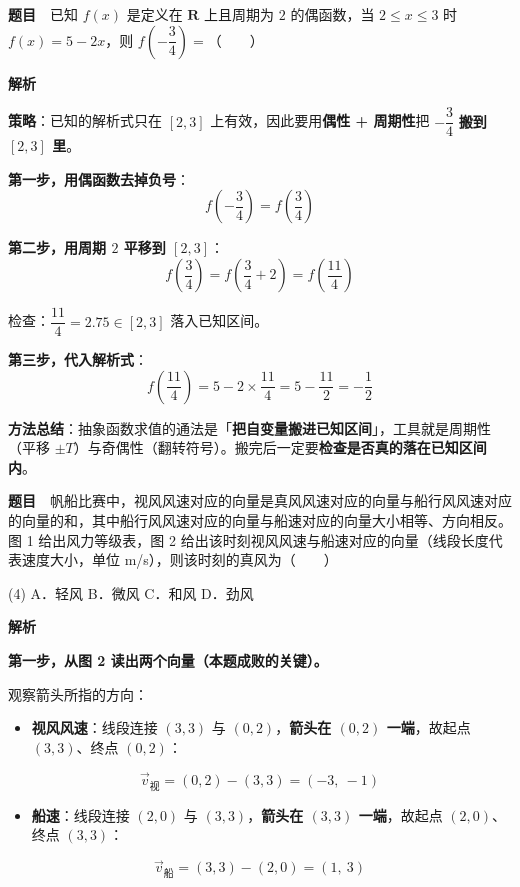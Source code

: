 \par\medskip


\textbf{题目}　已知 $f(x)$ 是定义在 $\mathbf R$ 上且周期为 $2$ 的偶函数，当 $2\le x\le3$ 时 $f(x)=5-2x$，则 $f\left(-\dfrac34\right)=$（　　）

\textbf{解析}

\textbf{策略}：已知的解析式只在 $[2,3]$ 上有效，因此要用\textbf{偶性 + 周期性}把 $-\dfrac34$ \textbf{搬到 $[2,3]$ 里}。

\textbf{第一步，用偶函数去掉负号}：
\[f\left(-\frac34\right)=f\left(\frac34\right)\]

\textbf{第二步，用周期 $2$ 平移到 $[2,3]$}：
\[f\left(\frac34\right)=f\left(\frac34+2\right)=f\left(\frac{11}{4}\right)\]

检查：$\dfrac{11}{4}=2.75\in[2,3]$  落入已知区间。

\textbf{第三步，代入解析式}：
\[f\left(\frac{11}{4}\right)=5-2\times\frac{11}{4}=5-\frac{11}{2}=-\frac12\]


\begin{gktip}
\textbf{方法总结}：抽象函数求值的通法是「\textbf{把自变量搬进已知区间}」，工具就是周期性（平移 $\pm T$）与奇偶性（翻转符号）。搬完后一定要\textbf{检查是否真的落在已知区间内}。
\end{gktip}

\par\medskip


\textbf{题目}　帆船比赛中，视风风速对应的向量是真风风速对应的向量与船行风风速对应的向量的和，其中船行风风速对应的向量与船速对应的向量大小相等、方向相反。图 1 给出风力等级表，图 2 给出该时刻视风风速与船速对应的向量（线段长度代表速度大小，单位 m/s），则该时刻的真风为（　　）

\begin{center}\end{center}

\begin{gkopts}(4)
\task A．轻风
\task B．微风
\task C．和风
\task D．劲风
\end{gkopts}

\textbf{解析}

\textbf{第一步，从图 2 读出两个向量（本题成败的关键）。}

观察箭头所指的方向：

\begin{itemize}
\item \textbf{视风风速}：线段连接 $(3,3)$ 与 $(0,2)$，\textbf{箭头在 $(0,2)$ 一端}，故起点 $(3,3)$、终点 $(0,2)$：
\end{itemize}
\[\vec v_{\text{视}}=(0,2)-(3,3)=(-3,\ -1)\]
\begin{itemize}
\item \textbf{船速}：线段连接 $(2,0)$ 与 $(3,3)$，\textbf{箭头在 $(3,3)$ 一端}，故起点 $(2,0)$、终点 $(3,3)$：
\end{itemize}
\[\vec v_{\text{船}}=(3,3)-(2,0)=(1,\ 3)\]

